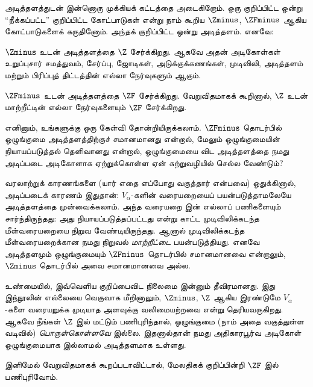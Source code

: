 \documentclass[../../../include/open-logic-section]{subfiles}
\begin{document}

அடித்தளத்துடன் இன்னொரு முக்கியக் கட்டத்தை அடைகிறோம். ஒரு குறிப்பிட்ட
ஒன்று ``நீக்கப்பட்ட'' குறிப்பிட்ட கோட்பாடுகள் என்று நாம் கூறிய
$\Zminus$, $\ZFminus$ ஆகிய கோட்பாடுகளைக் கருதினோம். அந்தக் குறிப்பிட்ட
ஒன்று அடித்தளம். எனவே:

\begin{defn}
$\Zminus$ உடன் அடித்தளத்தை $\Z$ சேர்க்கிறது. ஆகவே அதன் அடிகோள்கள்
உறுப்புசார் சமத்துவம், சேர்ப்பு, ஜோடிகள், அடுக்குக்கணங்கள், முடிவிலி,
அடித்தளம் மற்றும் பிரிப்புத் திட்டத்தின் எல்லா நேர்வுகளும் ஆகும்.

$\ZFminus$ உடன் அடித்தளத்தை $\ZF$ சேர்க்கிறது. வேறுவிதமாகக் கூறினால்,
$\Z$ உடன் மாற்றீட்டின் எல்லா நேர்வுகளையும் $\ZF$ சேர்க்கிறது.
\end{defn}

எனினும், உங்களுக்கு ஒரு கேள்வி தோன்றியிருக்கலாம். $\ZFminus$ தொடர்பில்
ஒழுங்குமை அடித்தளத்திற்குச் சமானமானது என்றால், மேலும் ஒழுங்குமையின்
நியாயப்படுத்தல் தெளிவானது என்றால், ஒழுங்குமையை விட அடித்தளத்தை நமது
அடிப்படை அடிகோளாக ஏற்றுக்கொள்ள ஏன் சுற்றுவழியில் செல்ல வேண்டும்?

வரலாற்றுக் காரணங்களை (யார் எதை எப்போது வகுத்தார் என்பவை) ஒதுக்கினால்,
அடிப்படைக் காரணம் இதுதான்: $V_\alpha$-களின் வரையறையைப் பயன்படுத்தாமலேயே
அடித்தளத்தை முன்வைக்கலாம். அந்த வரையறை  இன்
எல்லாப் பணிகளையும் சார்ந்திருந்தது: அது நியாயப்படுத்தப்பட்டது என்று
காட்ட முடிவிலிக்கடந்த மீள்வரையறையை நிறுவ வேண்டியிருந்தது. ஆனால்
முடிவிலிக்கடந்த மீள்வரையறைக்கான நமது நிறுவல் \emph{மாற்றீட்டை}
பயன்படுத்தியது. எனவே அடித்தளமும் ஒழுங்குமையும் $\ZFminus$ தொடர்பில்
சமானமானவை என்றாலும், $\Zminus$ தொடர்பில் அவை சமானமானவை அல்ல.

உண்மையில், இவ்வெளிய குறிப்பைவிட நிலைமை இன்னும் தீவிரமானது. இது இந்நூலின்
எல்லையை வெகுவாக மீறினாலும், $\Zminus$, $\Z$ ஆகிய இரண்டுமே
$V_\alpha$-களை வரையறுக்க முடியாத அளவுக்கு வலிமையற்றவை என்று தெரியவருகிறது.
ஆகவே நீங்கள் $\Z$ இல் மட்டும் பணிபுரிந்தால், ஒழுங்குமை (நாம் அதை
வகுத்துள்ள வடிவில்) \emph{பொருள்கொள்ளவே} இல்லை. இதனால்தான் நமது
அதிகாரபூர்வ அடிகோள் ஒழுங்குமையாக இல்லாமல் அடித்தளமாக உள்ளது.

இனிமேல் வேறுவிதமாகக் கூறப்படாவிட்டால், மேலதிகக் குறிப்பின்றி $\ZF$ இல்
பணிபுரிவோம்.
\end{document}
